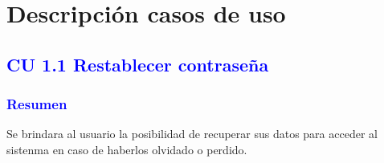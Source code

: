 \section{{Descripción casos de uso}}


\subsection{\textcolor{blue}{CU 1.1 Restablecer contraseña}}

\subsubsection{\textcolor{blue}{Resumen}}
Se brindara al usuario la posibilidad de recuperar sus datos para acceder al sistenma en caso de haberlos olvidado o perdido.
